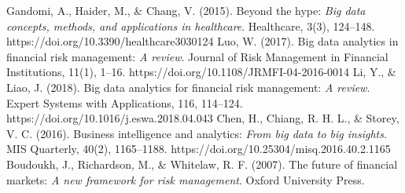 \begin{thebibliography}{30}

 Gandomi, A., Haider, M., \& Chang, V. (2015). Beyond the hype: \textit{Big data concepts, methods, and applications in healthcare}. Healthcare, 3(3), 124–148. https://doi.org/10.3390/healthcare3030124
 Luo, W. (2017). Big data analytics in financial risk management: \textit{A review}. Journal of Risk Management in Financial Institutions, 11(1), 1–16. https://doi.org/10.1108/JRMFI-04-2016-0014
 Li, Y., \& Liao, J. (2018). Big data analytics for financial risk management: \textit{A review}. Expert Systems with Applications, 116, 114–124. https://doi.org/10.1016/j.eswa.2018.04.043
 Chen, H., Chiang, R. H. L., \& Storey, V. C. (2016). Business intelligence and analytics: \textit{From big data to big insights}. MIS Quarterly, 40(2), 1165–1188. https://doi.org/10.25304/misq.2016.40.2.1165
 Boudoukh, J., Richardson, M., \& Whitelaw, R. F. (2007). The future of financial markets: \textit{A new framework for risk management}. Oxford University Press.


\end{thebibliography}
